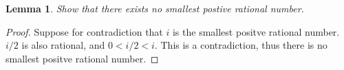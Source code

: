 \documentclass{article}
\newtheorem{lemma}{Lemma}
\begin{document}
\begin{lemma}
Show that there exists no smallest postive rational number.
\end{lemma}
 
\begin{proof}
Suppose for contradiction that $i$ is the smallest positve rational number. \(i/2\) is also rational, and \(0<i/2<i\). This is a contradiction, thus
there is no smallest positve rational number.
\end{proof}
\end{document}
